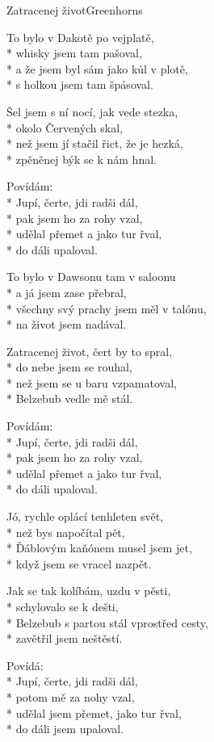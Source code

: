 \documentclass[10.5pt]{book}
\begin{document}
\begin{poem}{Zatracenej život}{Greenhorns}

\settowidth{\versewidth}{než jsem jí stačil řict, že je hezká,}

To bylo v Dakotě po vejplatě,\\*
whisky jsem tam pašoval,\\*
a že jsem byl sám jako kůl v plotě,\\*
s holkou jsem tam špásoval.

Šel jsem s ní nocí, jak vede stezka,\\*
okolo Červených skal,\\*
než jsem jí stačil řict, že je hezká,\\*
zpěněnej býk se k nám hnal.

Povídám:\\*
Jupí, čerte, jdi radši dál,\\*
pak jsem ho za rohy vzal,\\*
udělal přemet a jako tur řval,\\*
do dáli upaloval.

To bylo v Dawsonu tam v saloonu\\*
a já jsem zase přebral,\\*
všechny svý prachy jsem měl v talónu,\\*
na život jsem nadával.

Zatracenej život, čert by to spral,\\*
do nebe jsem se rouhal,\\*
než jsem se u baru vzpamatoval,\\*
Belzebub vedle mě stál.

Povídám:\\*
Jupí, čerte, jdi radši dál,\\*
pak jsem ho za rohy vzal,\\*
udělal přemet a jako tur řval,\\*
do dáli upaloval.

Jó, rychle oplácí tenhleten svět,\\*
než bys napočítal pět,\\*
Ďáblovým kaňónem musel jsem jet,\\*
když jsem se vracel nazpět.

Jak se tak kolíbám, uzdu v pěsti,\\*
schylovalo se k dešti,\\*
Belzebub s partou stál vprostřed cesty,\\*
zavětřil jsem neštěstí.

Povídá:\\*
Jupí, čerte, jdi radši dál,\\*
potom mě za nohy vzal,\\*
udělal jsem přemet, jako tur řval,\\*
do dáli jsem upaloval.

\end{poem}
\end{document}
